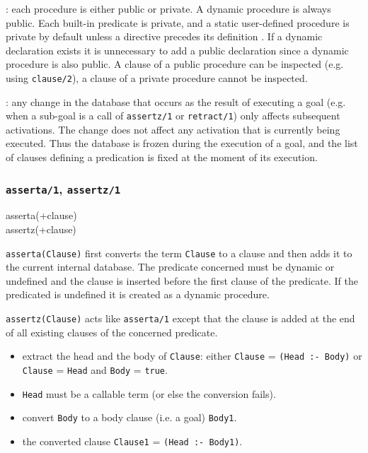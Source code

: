 : each procedure is either public or
private. A dynamic procedure is always public. Each built-in predicate is
private, and a static user-defined procedure is private by default unless a
 directive precedes its definition . If a
dynamic declaration exists it is unnecessary to add a public declaration
since a dynamic procedure is also public. A clause of a public procedure can
be inspected (e.g. using \texttt{clause/2}), a clause of a private procedure
cannot be inspected.

: any change in the database that
occurs as the result of executing a goal (e.g. when a sub-goal is a call of
\texttt{assertz/1} or \texttt{retract/1}) only affects subsequent
activations. The change does not affect any activation that is currently
being executed. Thus the database is frozen during the execution of a goal,
and the list of clauses defining a predication is fixed at the moment of its
execution.

\subsubsection{\texttt{asserta/1},
               \texttt{assertz/1}}

\begin{TemplatesOneCol}
asserta(+clause)\\
assertz(+clause)

\end{TemplatesOneCol}

\Description

\texttt{asserta(Clause)} first converts the term \texttt{Clause} to a clause
and then adds it to the current internal database. The predicate concerned
must be dynamic  or
undefined and the clause is inserted before the first clause of the
predicate. If the predicated is undefined it is created as a dynamic
procedure.

\texttt{assertz(Clause)} acts like \texttt{asserta/1} except that the clause
is added at the end of all existing clauses of the concerned predicate.


\begin{itemize}

\item extract the head and the body of \texttt{Clause}: either
\texttt{Clause} = \texttt{(Head :- Body)} or \texttt{Clause} = \texttt{Head}
and \texttt{Body} = \texttt{true}.

\item \texttt{Head} must be a callable term (or else the conversion fails).

\item convert \texttt{Body} to a body clause (i.e. a goal) \texttt{Body1}.

\item the converted clause \texttt{Clause1} = \texttt{(Head :- Body1)}.

\end{itemize}

